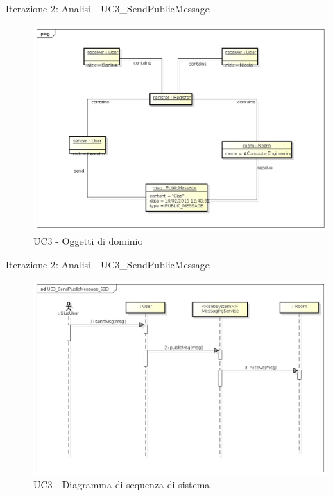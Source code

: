 \documentclass[t]{beamer} %
\begin{document}
\begin{frame} {Iterazione 2: Analisi - UC3\_SendPublicMessage}
   \begin{figure}
     \includegraphics[scale=0.315]{image_astah/Iteration_2_DomainModel/UC3_SendPublicMessage_OM.png}{\centering}
     \caption{UC3 - Oggetti di dominio}
     \label{fig_UC3_SPM_OM} 
   \end{figure}
\end{frame}

\begin{frame} {Iterazione 2: Analisi - UC3\_SendPublicMessage}
   \begin{figure}
     \includegraphics[scale=0.33]{image_astah/Iteration_2_DomainModel/UC3_SendPublicMessage_SSD.png}{\centering}
     \caption{UC3 - Diagramma di sequenza di sistema}
     \label{fig_UC3_SPM_SSD} 
   \end{figure}
\end{frame}
\end{document}

